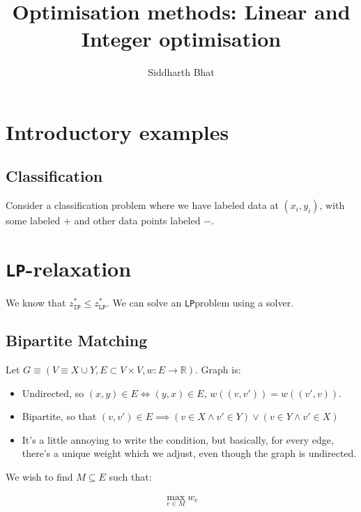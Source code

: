 \documentclass[11pt]{book}
\title{Optimisation methods: Linear and Integer optimisation}
\author{Siddharth Bhat}
\date{}
\newcommand{\ip}{\texttt{IP} }
\newcommand{\lp}{\texttt{LP}}
\newcommand{\R}{\ensuremath{\mathbb{R}}}
\begin{document}
\maketitle
\tableofcontents


\chapter{Introductory examples}


\section{Classification}
Consider a classification problem where we have labeled data at
$(x_i, y_i)$, with some labeled $+$ and other data points labeled $-$.

\chapter{\lp-relaxation}

We know that $z^*_\ip \leq z^*_\lp$. We can solve an \lp problem using
a solver.

\section{Bipartite Matching}
Let $G \equiv (V \equiv X \cup Y, E \subset V \times V, w: E \rightarrow \R)$. Graph is:
\begin{itemize}
    \item Undirected, so $(x, y) \in E \iff (y, x) \in E$, $w((v, v')) = w((v', v))$.
    \item Bipartite, so that $(v, v') \in E \implies (v \in X \land v'\in Y) \lor (v \in Y \land v' \in X)$
    \item It's a little annoying to write the condition, but basically, for
        every edge, there's a unique weight which we adjust, even though
        the graph is undirected.
\end{itemize}
        
        We wish to find $M \subseteq E$ such that:

\begin{align*}
\max_{e \in M} w_e \\
\end{align*}
\end{document}
